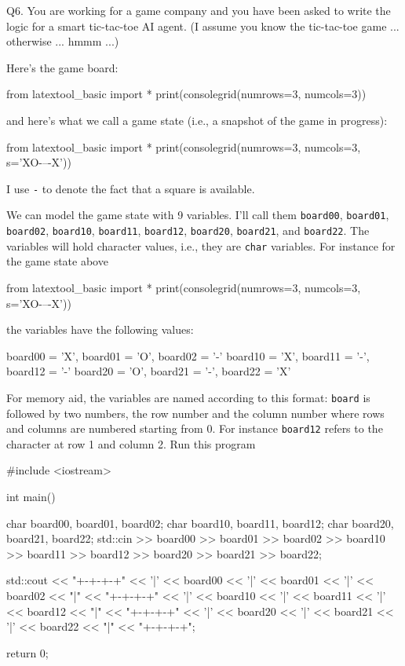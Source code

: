 Q6. You are working for a 
game company and you have
been asked to 
write the logic for a smart tic-tac-toe AI agent.
(I assume you know the tic-tac-toe game ... 
otherwise ... hmmm ...)

Here's the game board:
\begin{python}
from latextool_basic import *
print(consolegrid(numrows=3, numcols=3))
\end{python}
and here's what we call a game state (i.e., a snapshot 
of the game in progress):
\begin{python}
from latextool_basic import *
print(consolegrid(numrows=3, numcols=3, s='XO-\nX--\nO-X'))
\end{python}
I use \verb!-! to denote the fact that a square is available.

We can model the game state with 9 variables.
I'll call them 
\verb!board00!,
\verb!board01!,
\verb!board02!,
\verb!board10!,
\verb!board11!,
\verb!board12!,
\verb!board20!,
\verb!board21!, and
\verb!board22!.
The variables will hold character values, i.e., they are \verb!char!
variables.
For instance for the game state above
\begin{python}
from latextool_basic import *
print(consolegrid(numrows=3, numcols=3, s='XO-\nX--\nO-X'))
\end{python}
the variables have the following values:
\begin{console}[frame=none]

        board00 = 'X',  board01 = 'O',  board02 = '-'
        board10 = 'X',  board11 = '-',  board12 = '-'
        board20 = 'O',  board21 = '-',  board22 = 'X'

\end{console}
For memory aid, the variables are named according to this
format: \verb!board! is followed by two numbers, the row number and the
column number where rows and columns are numbered starting from 0.
For instance \verb!board12! refers to the character at row 1 and column 2.
Run this program
\begin{console}[fontsize=\small]
#include <iostream>

int main()
{
    char board00, board01, board02;
    char board10, board11, board12;
    char board20, board21, board22;
    std::cin >> board00 >> board01 >> board02
             >> board10 >> board11 >> board12
             >> board20 >> board21 >> board22;

    std::cout << "+-+-+-+\n"
              << '|' << board00 << '|' << board01 << '|' << board02 << "|\n"
              << "+-+-+-+\n"
              << '|' << board10 << '|' << board11 << '|' << board12 << "|\n"
              << "+-+-+-+\n"
              << '|' << board20 << '|' << board21 << '|' << board22 << "|\n"
              << "+-+-+-+\n";

    return 0;
}
\end{console}
